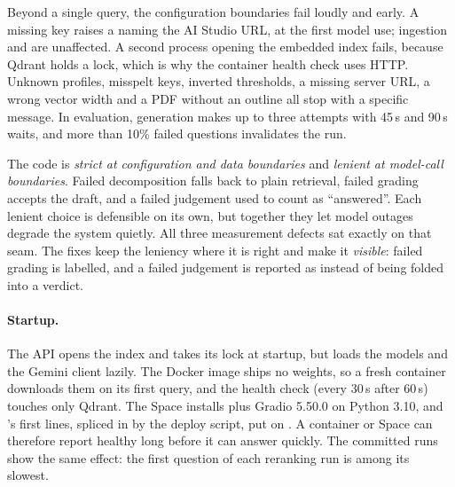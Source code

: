 Beyond a single query, the configuration boundaries fail loudly and early. A missing key raises a  naming the AI Studio URL, at the first model use; ingestion and  are unaffected. A second process opening the embedded index fails, because Qdrant holds a lock, which is why the container health check uses HTTP. Unknown profiles, misspelt keys, inverted thresholds, a missing server URL, a wrong vector width and a PDF without an outline all stop with a specific message. In evaluation, generation makes up to three attempts with 45\,s and 90\,s waits, and more than 10\% failed questions invalidates the run.

\begin{keyidea}
The code is \emph{strict at configuration and data boundaries} and \emph{lenient at model-call boundaries}. Failed decomposition falls back to plain retrieval, failed grading accepts the draft, and a failed judgement used to count as ``answered''. Each lenient choice is defensible on its own, but together they let model outages degrade the system quietly. All three measurement defects sat exactly on that seam. The fixes keep the leniency where it is right and make it \emph{visible}: failed grading is labelled, and a failed judgement is reported as  instead of being folded into a verdict.
\end{keyidea}

\paragraph{Startup.} The API opens the index and takes its lock at startup, but loads the models and the Gemini client lazily. The Docker image ships no weights, so a fresh container downloads them on its first query, and the health check (every 30\,s after 60\,s) touches only Qdrant. The Space installs  plus Gradio 5.50.0 on Python 3.10, and 's first lines, spliced in by the deploy script, put  on . \tagI{} A container or Space can therefore report healthy long before it can answer quickly. The committed runs show the same effect: the first question of each reranking run is among its slowest.
